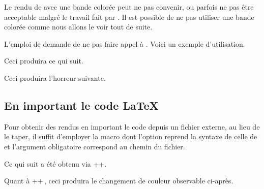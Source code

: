 Le rendu de  avec une bande colorée peut ne pas convenir, ou parfois ne pas être acceptable malgré le travail fait par .
Il est possible de ne pas utiliser une bande colorée comme nous allons le voir tout de suite.


\begin{tdocexa}
    L'emploi de  demande de ne pas faire appel à .
    Voici un exemple d'utilisation.



    Ceci produira ce qui suit.

    \medskip

    

\end{tdocexa}


\begin{tdocexa}
    \leavevmode



    Ceci produira l'horreur suivante.

    \medskip

    

\end{tdocexa}


\subsection{En important le code \LaTeX}

Pour obtenir des rendus en important le code depuis un fichier externe, au lieu de le taper, il suffit d'employer la macro  dont l'option reprend la syntaxe de celle de  et l'argument obligatoire correspond au chemin du fichier.


\begin{tdocexa}
    Ce qui suit a été obtenu via \tdocinlatex++.

    \medskip



    \medskip

    Quant à \tdocinlatex++\,, ceci produira le changement de couleur observable ci-après.

    \medskip


\end{tdocexa}


